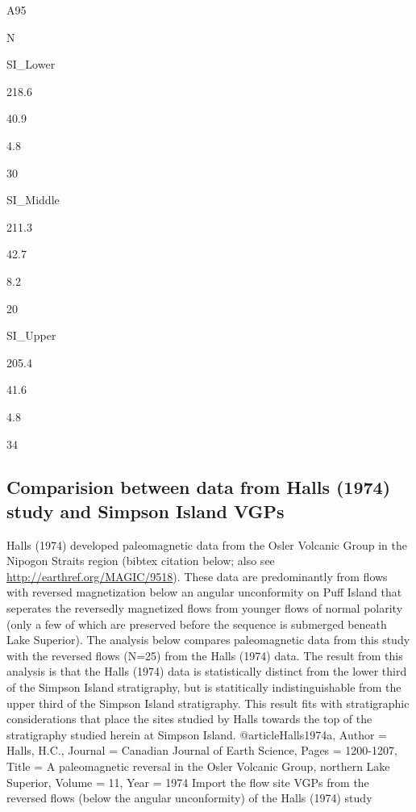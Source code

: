 \documentclass[letterpaper,10pt,english]{/Users/polarwander/Library/Enthought/Canopy_64bit/User/lib/python2.7/site-packages/sphinx/texinputs/sphinxhowto}
\begin{document}
A95

N

SI\_Lower

218.6

40.9

4.8

30

SI\_Middle

211.3

42.7

8.2

20

SI\_Upper

205.4

41.6

4.8

34\subsection{Comparision between data from Halls (1974) study and Simpson Island VGPs}Halls (1974) developed paleomagnetic data from the Osler Volcanic Group
in the Nipogon Straits region (bibtex citation below; also see
\url{http://earthref.org/MAGIC/9518}). These data are predominantly from
flows with reversed magnetization below an angular unconformity on Puff
Island that seperates the reversedly magnetized flows from younger flows
of normal polarity (only a few of which are preserved before the
sequence is submerged beneath Lake Superior). The analysis below
compares paleomagnetic data from this study with the reversed flows
(N=25) from the Halls (1974) data. The result from this analysis is that
the Halls (1974) data is statistically distinct from the lower third of
the Simpson Island stratigraphy, but is statitically indistinguishable
from the upper third of the Simpson Island stratigraphy. This result
fits with stratigraphic considerations that place the sites studied by
Halls towards the top of the stratigraphy studied herein at Simpson
Island.
@article{Halls1974a,
        Author = {Halls, H.C.},
        Journal = {Canadian Journal of Earth Science},
        Pages = {1200-1207},
        Title = {A paleomagnetic reversal in the {O}sler {V}olcanic
{G}roup, northern {L}ake {S}uperior},
        Volume = {11},
        Year = {1974}}
Import the flow site VGPs from the reversed flows (below the angular
unconformity) of the Halls (1974) study

\end{document}
